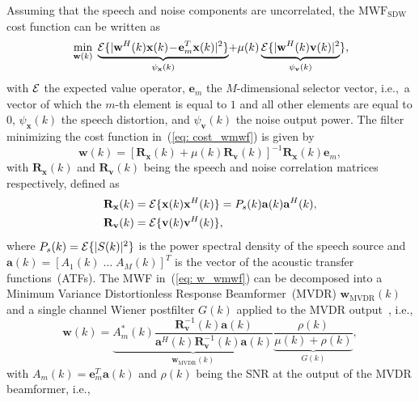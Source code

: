 \documentclass{article}
\begin{document}
Assuming that the speech and noise components are uncorrelated, the $\text{MWF}_{\text{SDW}}$ cost function can be written as
\begin{equation}
  \label{eq: cost_wmwf}
    \hspace{-0.03cm}\min_{\mathbf{w}(k)} \; \underbrace{{\cal{E}} \{ |\mathbf{w}^H(k) \mathbf{x}(k) \! - \! \mathbf{e}_m^T \mathbf{x}(k)|^2 \}}_{\psi_{\mathbf{x}}(k)} \! +  \mu(k) \underbrace{{\cal{E}} \{ |\mathbf{w}^H(k) \mathbf{v}(k)|^2}_{\psi_{\mathbf{v}}(k)} \}, \!\!
\end{equation}
with ${\cal{E}}$ the expected value operator, $\mathbf{e}_m$ the $M$-dimensional selector vector, i.e.,~a vector of which the $m$-th element is equal to $1$ and all other elements are equal to $0$, $\psi_{\mathbf{x}}(k)$ the speech distortion, and $\psi_{\mathbf{v}}(k)$ the noise output power.
The filter minimizing the cost function in~(\ref{eq: cost_wmwf}) is given by
\vspace{-0.1cm}
\begin{equation}
  \label{eq: w_wmwf}
  \mathbf{w}(k) = \left[ \mathbf{R}_{\mathbf{x}}(k) + \mu(k) \mathbf{R}_{\mathbf{v}}(k) \right]^{-1} \mathbf{R}_{\mathbf{x}}(k)\mathbf{e}_m,
\end{equation}
with $\mathbf{R}_{\mathbf{x}}(k)$ and $\mathbf{R}_{\mathbf{v}}(k)$ being the speech and noise correlation matrices respectively, defined as
\begin{align}
  \label{eq: corr}
  \mathbf{R}_{\mathbf{x}}(k) & = {\cal{E}}\{ \mathbf{x}(k)\mathbf{x}^H(k) \} = P_s(k) \mathbf{a}(k) \mathbf{a}^H(k), \\
  \mathbf{R}_{\mathbf{v}}(k) & = {\cal{E}} \{ \mathbf{v}(k)\mathbf{v}^H(k) \},
\end{align}
where $P_s(k) = {\cal{E}} \{|S(k)|^2 \}$ is the power spectral density of the speech source and $\mathbf{a}(k) = [A_1(k) \; \ldots \; A_M(k)]^T$ is the vector of the acoustic transfer functions~(ATFs).
The MWF in~(\ref{eq: w_wmwf}) can be decomposed into a Minimum Variance Distortionless Response Beamformer~(MVDR) $\mathbf{w}_{\text{MVDR}}(k)$ and a single channel Wiener postfilter $G(k)$ applied to the MVDR output~\cite{Simmer_book_2001}, i.e.,
\begin{equation}
  \label{eq: decomp}
  \mathbf{w}(k) = \underbrace{A_m^{*}(k)\frac{\mathbf{R}^{-1}_{\mathbf{v}}(k)\mathbf{a}(k)}{\mathbf{a}^H(k) \mathbf{R}^{-1}_{\mathbf{v}}(k)\mathbf{a}(k)}}_{\mathbf{w}_\text{MVDR}(k)}\underbrace{\frac{\rho(k)}{\mu(k) + \rho(k)}}_{G(k)},
\end{equation}
with $A_m(k) = \mathbf{e}_m^T \mathbf{a}(k)$ and $\rho(k)$ being the SNR at the output of the MVDR beamformer, i.e., 
\end{document}
